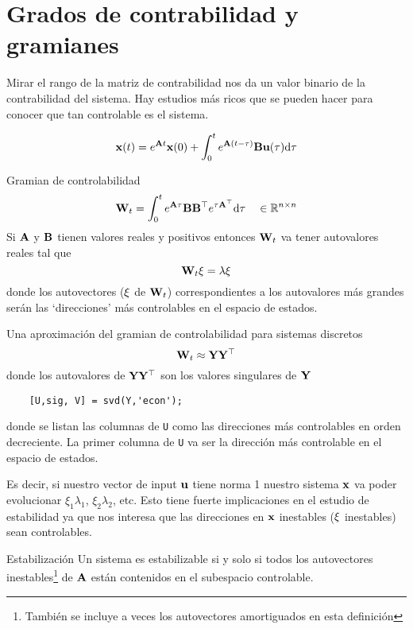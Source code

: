 \documentclass[11pt, a4paper, twoside, openright, openany]{book}
\newcommand{\dimss}{\dimfont{n}}
\begin{document}
\section{Grados de contrabilidad y gramianes}
Mirar el rango de la matriz de contrabilidad nos da un valor binario de la contrabilidad del sistema. Hay estudios más ricos que se pueden hacer para conocer que tan controlable es el sistema.


\[
\mathbf{x} (t) = e^{\mathbf{A} t} \mathbf{x}(0) + \int_0^t e^{\mathbf{A}(t-\tau)} \mathbf{B} \mathbf{u}(\tau) \textrm{d} \tau
\]

\begin{definition}{Gramian de controlabilidad}
\[
\MW_t = \int_0^t e^{\MA\tau} \MB \MB\tp e^{\tau\MA\tp } \di \tau  \quad \in \mathbb{R}^{\dimss\times\dimss}
	\]
Si $\mathbf{A}$ y $\mathbf{B}$ tienen valores reales y positivos entonces $\mathbf{W}_t$ va tener autovalores reales tal que 
\[
\mathbf{W}_t \mathbf{\xi} = \lambda \mathbf{\xi}
\]
donde los autovectores ($\mathbf{\xi}$ de $\mathbf{W}_t$) correspondientes a los autovalores más grandes serán las `direcciones' más controlables en el espacio de estados. 
\end{definition}

Una aproximación del gramian de controlabilidad para sistemas discretos
\[
\mathbf{W}_t \approx \mathbf{Y} \mathbf{Y}^{\top}
\]
donde los autovalores de $\mathbf{Y}\mathbf{Y}^{\top}$ son los valores singulares 	de $\mathbf{Y}$


\begin{lstlisting}
	[U,sig, V] = svd(Y,'econ');
\end{lstlisting}
donde se listan las columnas de \texttt{U} como las direcciones más controlables en orden decreciente. La primer columna de \texttt{U} va ser la dirección más controlable en el espacio de estados. 

Es decir, si nuestro vector de input $\mathbf{u}$ tiene norma 1 nuestro sistema $\mathbf{x}$ va poder evolucionar $\xi_1\lambda_1$, $\xi_2\lambda_2$, etc. Esto tiene fuerte implicaciones en el estudio de estabilidad ya que nos interesa que las direcciones en $\mathbf{x}$ inestables ($\mathbf{\xi}$ inestables) sean controlables.

\begin{definition}{Estabilización}
	Un sistema es estabilizable si y solo si todos los autovectores inestables\footnote{También se incluye a veces los autovectores amortiguados en esta definición} de $\mathbf{A}$ están contenidos en el subespacio controlable.
\end{definition}
\end{document}
